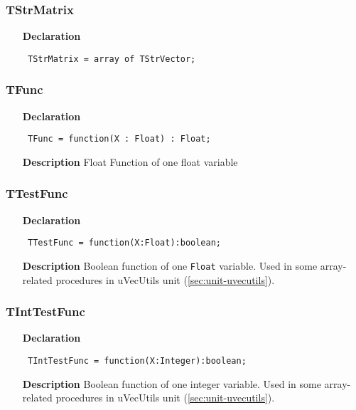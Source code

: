 \documentclass[12pt,a4paper,oneside]{report}
\newcommand{\lmath}[1]{   %
	\marginpar{\vspace{#1} 
		\begin{flushright}
			LMath
	\end{flushright} }
}
\newcommand{\declarationitem}[1]{\textbf{#1}}
\newcommand{\descriptiontitle}[1]{\textbf{#1}}
\newcommand{\code}[1]{\texttt{#1}}
\begin{document}
\subsubsection{TStrMatrix}
\label{utypes-TStrMatrix}
\begin{itemize}\item[\declarationitem{Declaration}\hfill]
	\begin{flushleft}
		\code{
			TStrMatrix  = array of TStrVector;}
		
	\end{flushleft}
	
\end{itemize}
\subsubsection{TFunc}
\label{utypes-TFunc}
\begin{itemize}\item[\declarationitem{Declaration}\hfill]
	\begin{flushleft}
		\code{
			TFunc = function(X : Float) : Float;}
	\end{flushleft}
	\item[\descriptiontitle{Description}]
		Float Function of one float variable
\end{itemize}

\subsubsection{TTestFunc}
\label{utypes-TTestFunc}
\lmath{-24pt}
\begin{itemize}\item[\declarationitem{Declaration}\hfill]
	\begin{flushleft}
		\code{
			TTestFunc     = function(X:Float):boolean;
		}
	\end{flushleft}
	\item[\descriptiontitle{Description}]
	Boolean function of one \code{Float} variable. Used in some array-related procedures in uVecUtils unit (\ref{sec:unit-uvecutils}).
\end{itemize}

\subsubsection{TIntTestFunc}
\label{utypes-TIntTestFunc}
\begin{itemize}\item[\declarationitem{Declaration}\hfill]
	\begin{flushleft}
		\code{
			TIntTestFunc     = function(X:Integer):boolean;
		}
	\end{flushleft}
	\item[\descriptiontitle{Description}]
	Boolean function of one integer variable. Used in some array-related procedures in uVecUtils unit (\ref{sec:unit-uvecutils}).
\end{itemize}
\end{document}
